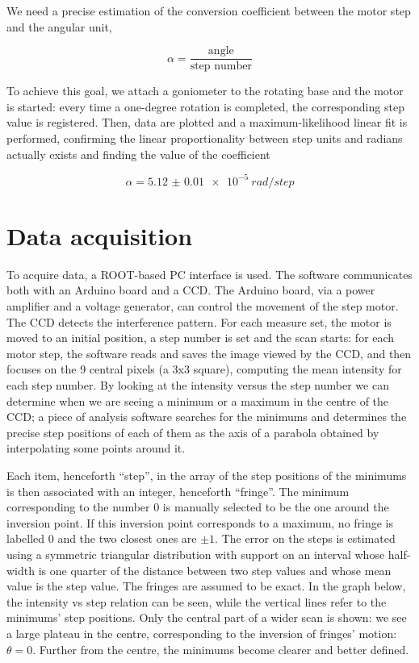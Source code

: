 \documentclass[a4paper, 12pt]{article}
\begin{document}
We need a precise estimation of the conversion coefficient between the motor step and the angular unit,

\begin{equation}
  \alpha = \frac{\text{angle}}{\text{step number}}
\end{equation}

To achieve this goal, we attach a goniometer to the rotating base and the motor is started: every time a one-degree rotation is completed, the corresponding step value is registered. Then, data are plotted and a maximum-likelihood linear fit is performed, confirming the linear proportionality between step units and radians actually exists and finding the value of the
coefficient

\begin{equation}
  \alpha =  \SI{5.12(1)e-5}{rad/step}
\end{equation}


\section{Data acquisition}

To acquire data, a ROOT-based PC interface is used. The software communicates both with an Arduino board and a CCD. The Arduino board, via a power amplifier and a voltage generator, can control the movement of the step motor. The CCD detects the interference pattern. For each measure set, the motor is moved to an initial position, a step number is set and the scan starts: for each motor step, the software reads and saves the image viewed by the CCD, and then focuses on the 9 central pixels (a 3x3 square), computing the mean intensity for each step number. By looking at the intensity versus the step number we can determine when we are seeing a minimum or a maximum in the centre of the CCD; a piece of analysis software searches for the minimums and determines the precise step positions of each of them as the axis of a parabola obtained by interpolating some points around it.

Each item, henceforth “step”, in the array of the step positions of the minimums is then associated with an integer, henceforth “fringe”. The minimum corresponding to the number 0 is manually selected to be the one around the inversion point. If this inversion point corresponds to a maximum, no fringe is labelled 0 and the two closest ones are $\pm 1$.
The error on the steps is estimated using a symmetric triangular distribution with support on an interval whose half-width is one quarter of the distance between two step values and whose mean value is the step value. The fringes are assumed to be exact.
In the graph below, the intensity vs step relation can be seen, while the vertical lines refer to the minimums’ step positions. Only the central part of a wider scan is shown: we see a large plateau in the centre, corresponding to the inversion of fringes’ motion: \(\theta
=0\). Further from the centre, the minimums become clearer and better defined.
\end{document}
